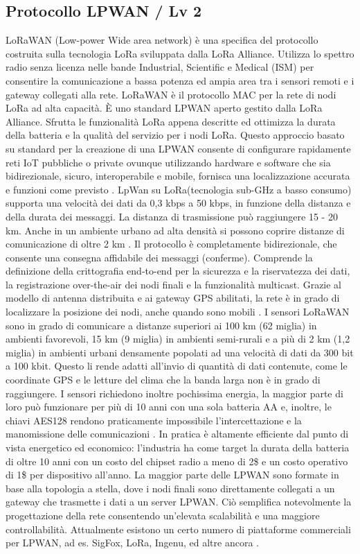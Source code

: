 \documentclass[a4paper]{report} %
\begin{document}
\subsection{Protocollo LPWAN / Lv 2}
LoRaWAN (Low-power Wide area network) è una specifica del protocollo costruita sulla tecnologia LoRa sviluppata dalla LoRa Alliance. Utilizza lo spettro radio senza licenza nelle bande Industrial, Scientific e Medical (ISM) per consentire la comunicazione a bassa potenza ed ampia area tra i sensori remoti e i gateway collegati alla rete. LoRaWAN è il protocollo MAC per la rete di nodi LoRa ad alta capacità. È uno standard LPWAN aperto gestito dalla LoRa Alliance. Sfrutta le funzionalità LoRa appena descritte ed ottimizza la durata della batteria e la qualità del servizio per i nodi LoRa. Questo approccio basato su standard per la creazione di una LPWAN consente di configurare rapidamente reti IoT pubbliche o private ovunque utilizzando hardware e software che sia bidirezionale, sicuro, interoperabile e mobile, fornisca una localizzazione accurata e funzioni come previsto \cite{art:rif.24}. 
LpWan su LoRa(tecnologia sub-GHz a basso consumo) supporta una velocità dei dati da 0,3 kbps a 50 kbps, in funzione della distanza e della durata dei messaggi. La distanza di trasmissione può raggiungere 15 - 20 km. Anche in un ambiente urbano ad alta densità si possono coprire distanze di comunicazione di oltre 2 km \cite{art:rif.20}. 
Il protocollo è completamente bidirezionale, che consente una consegna affidabile dei messaggi (conferme). Comprende la definizione della crittografia end-to-end per la sicurezza e la riservatezza dei dati, la registrazione over-the-air dei nodi finali e la funzionalità multicast. Grazie al modello di antenna distribuita e ai gateway GPS abilitati, la rete è in grado di localizzare la posizione dei nodi, anche quando sono mobili \cite{art:rif.30}.
I sensori LoRaWAN sono in grado di comunicare a distanze superiori ai 100 km (62 miglia) in ambienti favorevoli, 15 km (9 miglia) in ambienti semi-rurali e a più di 2 km (1,2 miglia) in ambienti urbani densamente popolati ad una velocità di dati da 300 bit a 100 kbit. Questo li rende adatti all'invio di quantità di dati contenute, come le coordinate GPS e le letture del clima che la banda larga non è in grado di raggiungere. I sensori richiedono inoltre pochissima energia, la maggior parte di loro può funzionare per più di 10 anni con una sola batteria AA e, inoltre, le chiavi AES128 rendono praticamente impossibile l'intercettazione e la manomissione delle comunicazioni \cite{art:rif.25}. 
In pratica è altamente efficiente dal punto di vista energetico ed economico: l'industria ha come target la durata della batteria di oltre 10 anni con un costo del chipset radio a meno di 2\$ e un costo operativo di 1\$ per dispositivo all'anno. La maggior parte delle LPWAN sono formate in base alla topologia a stella, dove i nodi finali sono direttamente collegati a un gateway che trasmette i dati a un server LPWAN. Ciò semplifica notevolmente la progettazione della rete consentendo un'elevata scalabilità e una maggiore controllabilità. Attualmente esistono un certo numero di piattaforme commerciali per LPWAN, ad es. SigFox, LoRa, Ingenu, ed altre ancora \cite{art:rif.47}. 
\end{document}

